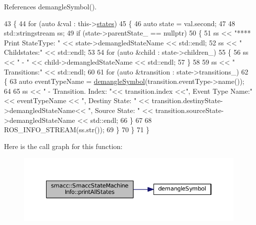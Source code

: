 References demangle\+Symbol().


\begin{DoxyCode}
43     \{
44         \textcolor{keywordflow}{for} (\textcolor{keyword}{auto} &val : this->\hyperlink{classsmacc_1_1SmaccStateMachineInfo_a8d6f1a9ce60f39835e7aa2179139977f}{states})
45         \{
46             \textcolor{keyword}{auto} state = val.second;
47 
48             std::stringstream ss;
49             \textcolor{keywordflow}{if} (state->parentState\_ == \textcolor{keyword}{nullptr})
50             \{
51                 ss << \textcolor{stringliteral}{"**** Print StateType: "} << state->demangledStateName << std::endl;
52                 ss << \textcolor{stringliteral}{" Childstates:"} << std::endl;
53 
54                 \textcolor{keywordflow}{for} (\textcolor{keyword}{auto} &child : state->children\_)
55                 \{
56                     ss << \textcolor{stringliteral}{" - "} << child->demangledStateName << std::endl;
57                 \}
58 
59                 ss << \textcolor{stringliteral}{" Transitions:"} << std::endl;
60 
61                 \textcolor{keywordflow}{for} (\textcolor{keyword}{auto} &transition : state->transitions\_)
62                 \{
63                     \textcolor{keyword}{auto} eventTypeName = \hyperlink{common_8h_a401d7e4f000fd4246a20be1e7d5ec2fc}{demangleSymbol}(transition.eventType->name());
64 
65                     ss << \textcolor{stringliteral}{" - Transition. Index: "}<< transition.index <<\textcolor{stringliteral}{", Event Type Name:"} << 
      eventTypeName << \textcolor{stringliteral}{", Destiny State: "} <<  transition.destinyState->demangledStateName<< \textcolor{stringliteral}{", Source State: "} <<  
      transition.sourceState->demangledStateName << std::endl;
66                 \}
67 
68                 ROS\_INFO\_STREAM(ss.str());
69             \}
70         \}
71     \}
\end{DoxyCode}


Here is the call graph for this function\+:
\nopagebreak
\begin{figure}[H]
\begin{center}
\leavevmode
\includegraphics[width=350pt]{classsmacc_1_1SmaccStateMachineInfo_a9f7848e013ff10b06f5a32cf81bd108f_cgraph}
\end{center}
\end{figure}





